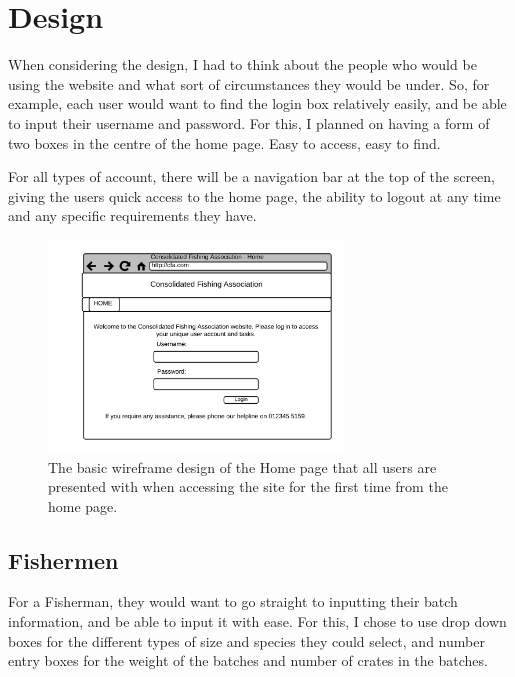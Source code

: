 \documentclass{article}
\begin{document}
\section{Design}
When considering the design, I had to think about the people who would be using the website and what sort of circumstances they would be under. So, for example, each user would want to find the login box relatively easily, and be able to input their username and password. For this, I planned on having a form of two boxes in the centre of the home page. Easy to access, easy to find.

For all types of account, there will be a navigation bar at the top of the screen, giving the users quick access to the home page, the ability to logout at any time and any specific requirements they have.

\begin{figure}[H]
	\centering
	\includegraphics[width=0.7\textwidth]{img/wf1.png}
	\caption{The basic wireframe design of the Home page that all users are presented with when accessing the site for the first time from the home page.}
\end{figure}

\subsection{Fishermen}

For a Fisherman, they would want to go straight to inputting their batch information, and be able to input it with ease. For this, I chose to use drop down boxes for the different types of size and species they could select, and number entry boxes for the weight of the batches and number of crates in the batches.
\end{document}
